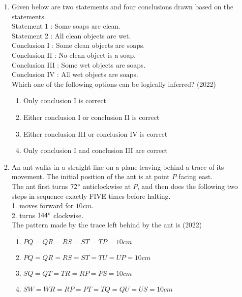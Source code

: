 \documentclass[journal]{IEEEtran}
\begin{document}
\begin{enumerate}
\item Given below are two statements and four conclusions drawn based on the
statements.\\

Statement 1 : Some soaps are clean.\\
Statement 2 :  All clean objects are wet.\\

Conclusion \textsc{I} : Some clean objects are soaps.\\
Conclusion \textsc{II} : No clean object is a soap.\\
Conclusion \textsc{III} :  Some wet objects are soaps.\\
Conclusion \textsc{IV} : All wet objects are soaps.\\

Which one of the following options can be logically inferred? \hfill(2022)
\begin{enumerate}
\item Only conclusion \textsc{I} is correct
\item Either conclusion \textsc{I} or conclusion \textsc{II} is correct
\item Either conclusion \textsc{III} or conclusion \textsc{IV} is correct
\item Only conclusion \textsc{I} and conclusion \textsc{III} are correct 
\end{enumerate}


\item An ant walks in a straight line on a plane leaving behind a trace of its
movement. The initial position of the ant is at point $P$ facing east.\\

The ant first turns $72\degree$ anticlockwise at $P$, and then does the following two
steps in sequence exactly FIVE times before halting.\\

1. moves forward for $10cm$.\\
2. turns $144\degree$ clockwise.\\



The pattern made by the trace left behind by the ant is \hfill(2022)
\begin{enumerate}
\item  $PQ=QR=RS=ST=TP=10cm$
\item  $PQ=QR=RS=ST=TU=UP=10cm$
\item  $SQ=QT=TR=RP=PS=10cm$
\item  $SW=WR=RP=PT=TQ=QU=US=10cm$
\end{enumerate}



\end{enumerate}
\end{document}
